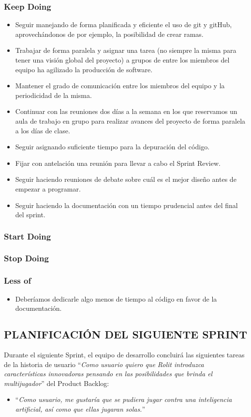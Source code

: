 \documentclass[../../SCRUM.tex]{subfiles}
\begin{document}
\subsubsection{Keep Doing}
\begin{itemize}
\item
  Seguir manejando de forma planificada y eficiente el uso de git y
  gitHub, aprovechándonos de por ejemplo, la posibilidad de crear ramas.
\item
  Trabajar de forma paralela y asignar una tarea (no siempre la misma
  para tener una visión global del proyecto) a grupos de entre los
  miembros del equipo ha agilizado la producción de software.
\item
  Mantener el grado de comunicación entre los miembros del equipo y la
  periodicidad de la misma.
\item
  Continuar con las reuniones dos días a la semana en los que reservamos
  un aula de trabajo en grupo para realizar avances del proyecto de
  forma paralela a los días de clase.
\item
  Seguir asignando suficiente tiempo para la depuración del código.
\item
  Fijar con antelación una reunión para llevar a cabo el Sprint Review.
\item
  Seguir haciendo reuniones de debate sobre cuál es el mejor diseño
  antes de empezar a programar.
\item
  Seguir haciendo la documentación con un tiempo prudencial antes del
  final del sprint.
\end{itemize}

\subsubsection{Start Doing}

\subsubsection{Stop Doing}

\subsubsection{Less of}
\begin{itemize}
\item
  Deberíamos dedicarle algo menos de tiempo al código en favor de la
  documentación.
\end{itemize}

\subsection{PLANIFICACIÓN DEL SIGUIENTE SPRINT}
Durante el siguiente Sprint, el equipo de desarrollo concluirá las siguientes tareas de la historia de usuario ``\textit{Como usuario quiero que Rolit introduzca características innovadoras pensando en las posibilidades que brinda el multijugador}'' del Product Backlog:
\begin{itemize}
\item ``\textit{Como usuario, me gustaría que se pudiera jugar
contra una inteligencia artificial, así como que ellas jugaran solas.}''
\end{itemize}
\end{document}
